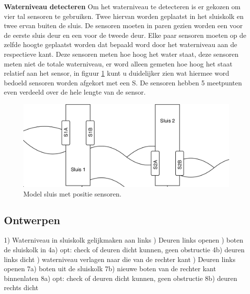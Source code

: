 \documentclass{article}
\begin{document}
\noindent\textbf{Waterniveau detecteren}\newline
\newline Om het waterniveau te detecteren is er gekozen om vier tal sensoren te gebruiken. Twee hiervan worden geplaatst in het sluiskolk en twee ervan buiten de sluis. De sensoren moeten in paren gezien worden een voor de eerste sluis deur en een voor de tweede deur. Elke paar sensoren moeten op de zelfde hoogte geplaatst worden dat bepaald word door het waterniveau aan de respectieve kant. Deze sensoren meten hoe hoog het water staat, deze sensoren meten niet de totale waterniveau, er word alleen gemeten hoe hoog het staat relatief aan het sensor, in figuur \ref{fig:sluiceSensoren} kunt u duidelijker zien wat hiermee word bedoeld sensoren worden afgekort met een S. De sensoren hebben 5 meetpunten even verdeeld over de hele lengte van de sensor.
\begin{figure}[!h]
	\centering
	\includegraphics[width=\textwidth]{images/sluis_sensoren.png}
    \caption{Model sluis met positie sensoren.}
	\label{fig:sluiceSensoren}
\end{figure} \newpage



\subsection{Ontwerpen}

1) Waterniveau in sluiskolk gelijkmaken aan links ) Deuren links openen ) boten de sluiskolk in \newline
4a) opt: check of deuren dicht kunnen, geen obstructie \newline
4b) deuren links dicht ) waterniveau verlagen naar die van de rechter kant ) Deuren links openen \newline
7a) boten uit de sluiskolk \newline
7b) nieuwe boten van de rechter kant binnenlaten \newline
8a) opt: check of deuren dicht kunnen, geen obstructie \newline
8b) deuren rechts dicht \newline
\end{document}
